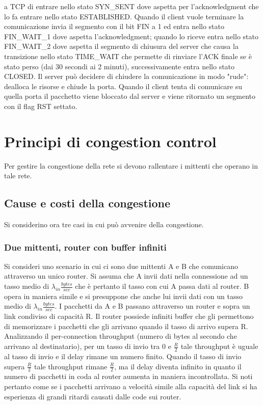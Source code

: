 a TCP di entrare nello stato SYN\_SENT dove aspetta per l'acknowledgment che lo fa entrare nello stato ESTABLISHED. Quando il client vuole terminare la 
comunicazione invia il segmento con il bit FIN a 1 ed entra nello stato FIN\_WAIT\_1 dove aspetta l'acknowledgment; quando lo riceve entra nello stato 
FIN\_WAIT\_2 dove aspetta il segmento di chiusura del server che causa la transizione nello stato TIME\_WAIT che permette di rinviare l'ACK finale se \`e 
stato perso (dai 30 secondi ai 2 minuti), successivamente entra nello stato CLOSED. Il server
pu\`o decidere di chiudere la comunicazione in modo "rude": dealloca le risorse e chiude la porta. Quando il client tenta di comunicare su quella porta il pacchetto viene bloccato dal
server e viene ritornato un segmento con il flag RST settato.
\section{Principi di congestion control}
Per gestire la congestione della rete si devono rallentare i mittenti che operano in tale rete. 
\subsection{Cause e costi della congestione}
Si considerino ora tre casi in cui pu\`o avvenire della congestione. 
\subsubsection{Due mittenti, router con buffer infiniti}
Si consideri uno scenario in cui ci sono due mittenti A e B che comunicano attraverso un unico router. Si assuma che A invii dati nella connessione ad un 
tasso medio di $\lambda_{in}\frac{bytes}{sec}$ che \`e pertanto il tasso con cui A passa dati al router. B opera in maniera simile e si presuppone che anche
lui invii dati con un tasso medio di $\lambda_{in}\frac{bytes}{sec}$. I pacchetti da A e B passano attraverso un router e sopra un link condiviso di 
capacit\`a R. Il router possiede infiniti buffer che gli permettono di memorizzare i pacchetti che gli arrivano quando il tasso di arrivo supera R. 
Analizzando il per-connection throughput (numero di bytes al secondo che arrivano al destinatario), per un tasso di invio tra 0 e $\frac{R}{2}$ tale 
throughput \`e uguale al tasso di invio e il delay rimane un numero finito.  Quando il tasso di invio supera $\frac{R}{2}$ tale throughput rimane $\frac{R}
{2}$, ma il delay diventa infinito in quanto il numero di pacchetti in coda al router aumenta in maniera incontrollata. Si noti pertanto come se i pacchetti 
arrivano a velocit\`a simile alla capacit\`a del link si ha esperienza di grandi ritardi causati dalle code sui router. 
